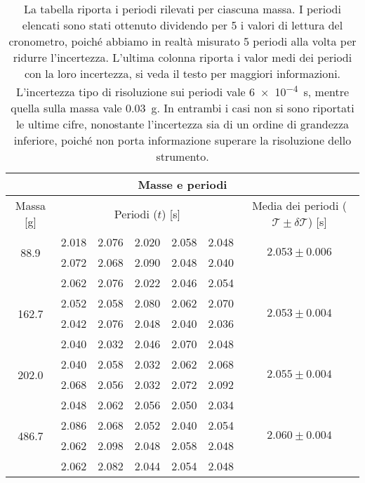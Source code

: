 \begin{table}
    \centering
    \begin{tabular}{c c c c c c c}
        \multicolumn{7}{c}{\textbf{Masse e periodi}} \\
        \toprule
        Massa [\si{\gram}] & \multicolumn{5}{c}{Periodi ($t$) [s]} & Media dei periodi ($\mathcal{T} \pm \delta \mathcal{T}$) [s] \\
        \midrule
            \multirow{2}{*}{88.9}	 & 2.018 & 2.076 & 2.020 & 2.058 & 2.048 &   \multirow{2}{*}{$2.053 \pm 0.006$} \\
                                     & 2.072 & 2.068 & 2.090 & 2.048 & 2.040 & \\                     
                                     & 2.062 & 2.076 & 2.022 & 2.046 & 2.054 & \\                    
                        \midrule                                                                     
            \multirow{2}{*}{162.7}	 & 2.052 & 2.058 & 2.080 & 2.062 & 2.070 &  \multirow{2}{*}{$2.053 \pm 0.004$} \\
                                     & 2.042 & 2.076 & 2.048 & 2.040 & 2.036 & \\
                                     & 2.040 & 2.032 & 2.046 & 2.070 & 2.048 & \\
                        \midrule
            \multirow{2}{*}{202.0}	& 2.040 & 2.058 & 2.032 & 2.062 & 2.068 &     \multirow{2}{*}{$2.055 \pm 0.004$} \\
                                     & 2.068 & 2.056 & 2.032 & 2.072 & 2.092 &  \\
                                     & 2.048 & 2.062 & 2.056 & 2.050 & 2.034 &  \\
                        \midrule
            \multirow{2}{*}{486.7}& 2.086 & 2.068 & 2.052 & 2.040 & 2.054 &	   \multirow{2}{*}{$2.060 \pm 0.004$} \\
                                  & 2.062 & 2.098 & 2.048 & 2.058 & 2.048 &   \\
                                  & 2.062 & 2.082 & 2.044 & 2.054 & 2.048 &   \\
        \bottomrule
    \end{tabular}
    \caption{La tabella riporta i periodi rilevati per ciascuna massa. I periodi elencati sono stati ottenuto dividendo per 5
        i valori di lettura del cronometro, poiché abbiamo in realtà misurato 5 periodi alla volta per ridurre l'incertezza.
        L'ultima colonna riporta i valor medi dei periodi con la loro incertezza, si veda il testo per maggiori informazioni.
        L'incertezza tipo di risoluzione sui periodi vale \SI{6e-4}{\second}, mentre quella sulla massa vale \SI{0.03}{\gram}.
        In entrambi i casi non si sono riportati le ultime cifre, nonostante l'incertezza sia di un ordine di grandezza inferiore,
        poiché non porta informazione superare la risoluzione dello strumento.}
    \label{tab:masse_periodi}
\end{table}

